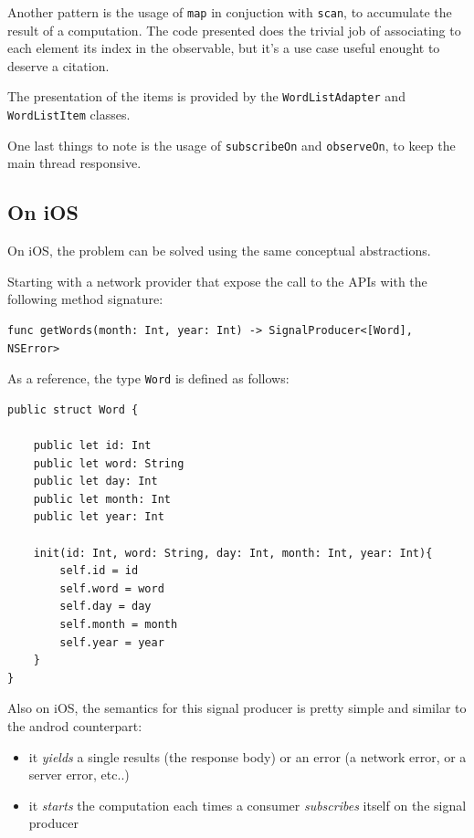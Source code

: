 Another pattern is the usage of \texttt{map} in conjuction with
\texttt{scan}, to accumulate the result of a computation. The code
presented does the trivial job of associating to each element its index
in the observable, but it's a use case useful enought to deserve a
citation.

The presentation of the items is provided by the
\texttt{WordListAdapter} and \texttt{WordListItem} classes.

One last things to note is the usage of \texttt{subscribeOn} and
\texttt{observeOn}, to keep the main thread responsive.

\subsection{On iOS}\label{on-ios}

On iOS, the problem can be solved using the same conceptual
abstractions.

Starting with a network provider that expose the call to the APIs with
the following method signature:

\begin{verbatim}
func getWords(month: Int, year: Int) -> SignalProducer<[Word], NSError>
\end{verbatim}

As a reference, the type \texttt{Word} is defined as follows:

\begin{verbatim}
public struct Word {

    public let id: Int
    public let word: String
    public let day: Int
    public let month: Int
    public let year: Int

    init(id: Int, word: String, day: Int, month: Int, year: Int){
        self.id = id
        self.word = word
        self.day = day
        self.month = month
        self.year = year
    }
}
\end{verbatim}

Also on iOS, the semantics for this signal producer is pretty simple and
similar to the androd counterpart:

\begin{itemize}
\itemsep1pt\parskip0pt
\item
  it \emph{yields} a single results (the response body) or an error (a
  network error, or a server error, etc..)
\item
  it \emph{starts} the computation each times a consumer
  \emph{subscribes} itself on the signal producer
\end{itemize}

